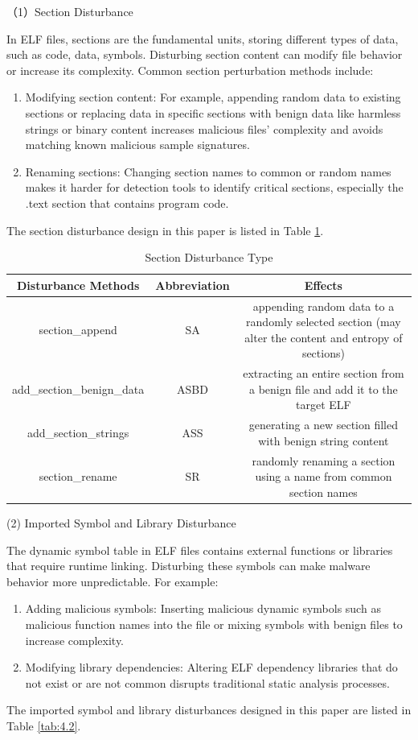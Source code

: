 （1）Section Disturbance

In ELF files, sections are the fundamental units, storing different types of data, such as code, data, symbols. Disturbing section content can modify file behavior or increase its complexity. Common section perturbation methods include:
\begin{enumerate}

\item Modifying section content: For example, appending random data to existing sections or replacing data in specific sections with benign data like harmless strings or binary content increases malicious files’ complexity and avoids matching known malicious sample signatures.

\item Renaming sections: Changing section names to common or random names makes it harder for detection tools to identify critical sections, especially the .text section that contains program code.

\end{enumerate}

The section disturbance design in this paper is listed in Table \ref{tab:4.1}.

\begin{table}[htbp]
	\centering
	\caption{Section Disturbance Type}\label{tab:4.1}
	\begin{tabular*}{\textwidth}{@{\extracolsep{\fill}}ccc}
		\toprule
		Disturbance Methods & Abbreviation & Effects \\
		\midrule
		section\_append & SA & appending random data to a randomly selected section (may alter the content and entropy of sections) \\
		add\_section\_benign\_data & ASBD & extracting an entire section from a benign file and add it to the target ELF \\
		add\_section\_strings & ASS & generating a new section filled with benign string content \\
		section\_rename & SR & randomly renaming a section using a name from common section names \\
		\bottomrule
	\end{tabular*}
\end{table}


(2) Imported Symbol and Library Disturbance

The dynamic symbol table in ELF files contains external functions or libraries that require runtime linking. Disturbing these symbols can make malware behavior more unpredictable. For example:
\begin{enumerate}
	
\item Adding malicious symbols: Inserting malicious dynamic symbols such as malicious function names into the file or mixing symbols with benign files to increase complexity.

\item Modifying library dependencies: Altering ELF dependency libraries that do not exist or are not common disrupts traditional static analysis processes.
\end{enumerate}
The imported symbol and library disturbances designed in this paper are listed in Table \ref{tab:4.2}.

